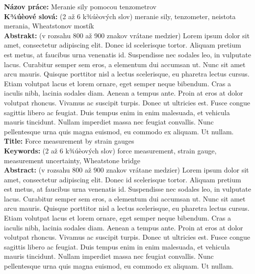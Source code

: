 \noindent
\textbf{Názov práce:} Meranie sily pomocou tenzometrov\\
\textbf{K¾úèové slová: } (2 až 6 k¾úèových slov) meranie sily, tenzometer, neistota merania, Wheatstonov mostík\\
\textbf{Abstrakt: } (v rozsahu 800 až 900 znakov vrátane medzier) Lorem ipsum dolor sit amet, consectetur adipiscing elit. Donec id scelerisque tortor. Aliquam pretium est metus, at faucibus urna venenatis id. Suspendisse nec sodales leo, in vulputate lacus. Curabitur semper sem eros, a elementum dui accumsan ut. Nunc sit amet arcu mauris. Quisque porttitor nisl a lectus scelerisque, eu pharetra lectus cursus. Etiam volutpat lacus et lorem ornare, eget semper neque bibendum. Cras a iaculis nibh, lacinia sodales diam. Aenean a tempus ante. Proin at eros at dolor volutpat rhoncus. Vivamus ac suscipit turpis. Donec ut ultricies est. Fusce congue sagittis libero ac feugiat. Duis tempus enim in enim malesuada, et vehicula mauris tincidunt. Nullam imperdiet massa nec feugiat convallis. Nunc pellentesque urna quis magna euismod, eu commodo ex aliquam. Ut nullam.\\

\noindent
\textbf{Title:} Force measurement by strain gauges\\
\textbf{Keywords: } (2 až 6 k¾úèových slov) force measurement, strain gauge, measurement uncertainty, Wheatstone bridge\\
\textbf{Abstract: } (v rozsahu 800 až 900 znakov vrátane medzier) Lorem ipsum dolor sit amet, consectetur adipiscing elit. Donec id scelerisque tortor. Aliquam pretium est metus, at faucibus urna venenatis id. Suspendisse nec sodales leo, in vulputate lacus. Curabitur semper sem eros, a elementum dui accumsan ut. Nunc sit amet arcu mauris. Quisque porttitor nisl a lectus scelerisque, eu pharetra lectus cursus. Etiam volutpat lacus et lorem ornare, eget semper neque bibendum. Cras a iaculis nibh, lacinia sodales diam. Aenean a tempus ante. Proin at eros at dolor volutpat rhoncus. Vivamus ac suscipit turpis. Donec ut ultricies est. Fusce congue sagittis libero ac feugiat. Duis tempus enim in enim malesuada, et vehicula mauris tincidunt. Nullam imperdiet massa nec feugiat convallis. Nunc pellentesque urna quis magna euismod, eu commodo ex aliquam. Ut  nullam.
\cleardoublepage 
